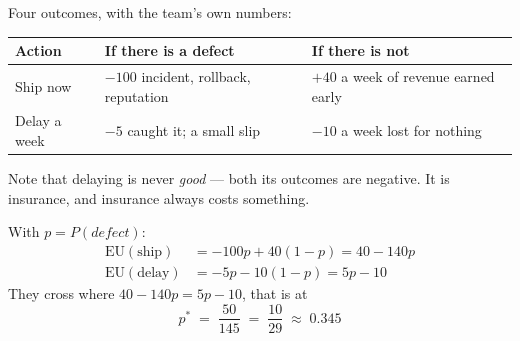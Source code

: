\begin{examplebox}
Four outcomes, with the team's own numbers:

\smallskip
\noindent\begin{tabular}{@{}L{3.6cm}L{4.6cm}L{6.0cm}@{}}
\toprule
\textbf{Action} & \textbf{If there is a defect} & \textbf{If there is not} \\
\midrule
Ship now & $-100$ \newline incident, rollback, reputation &
$+40$ \newline a week of revenue earned early \\
Delay a week & $-5$ \newline caught it; a small slip &
$-10$ \newline a week lost for nothing \\
\bottomrule
\end{tabular}

\smallskip
Note that delaying is never \emph{good} --- both its outcomes are negative. It is
insurance, and insurance always costs something.
\end{examplebox}

With $p = P(\mathit{defect})$:
\begin{align*}
  \mathrm{EU}(\text{ship}) &= -100p + 40(1-p) = 40 - 140p \\
  \mathrm{EU}(\text{delay}) &= -5p - 10(1-p) = 5p - 10
\end{align*}
They cross where $40 - 140p = 5p - 10$, that is at
\[
  p^{*} \;=\; \frac{50}{145} \;=\; \frac{10}{29} \;\approx\; 0.345
\]

